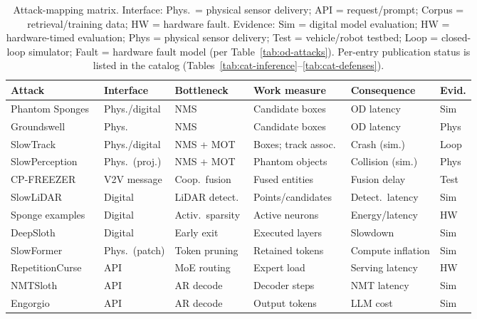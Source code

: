 \documentclass[acmsmall,screen,review,nonacm]{acmart}
\begin{document}
\begin{table}[htbp]
  \caption{Attack-mapping matrix. Interface: Phys.\ = physical sensor delivery; API = request/prompt; Corpus = retrieval/training data; HW = hardware fault. Evidence: Sim = digital model evaluation; HW = hardware-timed evaluation; Phys = physical sensor delivery; Test = vehicle/robot testbed; Loop = closed-loop simulator; Fault = hardware fault model (per Table~\ref{tab:od-attacks}). Per-entry publication status is listed in the catalog (Tables~\ref{tab:cat-inference}--\ref{tab:cat-defenses}).}
  \label{tab:matrix}
  \footnotesize
  \setlength{\tabcolsep}{5pt}
  \begin{tabularx}{\textwidth}{@{}l l L{2.4cm} L{2.6cm} L{2.6cm} l@{}}
    \toprule
    \textbf{Attack} & \textbf{Interface} & \textbf{Bottleneck} & \textbf{Work measure} & \textbf{Consequence} & \textbf{Evid.} \\
    \midrule
    Phantom Sponges~\cite{shapira2023phantom} & Phys./digital & NMS & Candidate boxes & OD latency & Sim \\
    Groundswell~\cite{xia2026groundswell} & Phys.\ & NMS & Candidate boxes & OD latency & Phys \\
    SlowTrack~\cite{ma2024slowtrack} & Phys./digital & NMS + MOT & Boxes; track assoc.\ & Crash (sim.) & Loop \\
    SlowPerception~\cite{ma2024slowperception} & Phys.\ (proj.) & NMS + MOT & Phantom objects & Collision (sim.) & Phys \\
    CP-FREEZER~\cite{wang2026cpfreezer} & V2V message & Coop.\ fusion & Fused entities & Fusion delay & Test \\
    SlowLiDAR~\cite{liu2023slowlidar} & Digital & LiDAR detect.\ & Points/candidates & Detect.\ latency & Sim \\
    Sponge examples~\cite{shumailov2021sponge} & Digital & Activ.\ sparsity & Active neurons & Energy/latency & HW \\
    DeepSloth~\cite{hong2021deepsloth} & Digital & Early exit & Executed layers & Slowdown & Sim \\
    SlowFormer~\cite{navaneet2024slowformer} & Phys.\ (patch) & Token pruning & Retained tokens & Compute inflation & Sim \\
    RepetitionCurse~\cite{huang2025repetitioncurse} & API & MoE routing & Expert load & Serving latency & HW \\
    NMTSloth~\cite{chen2022nmtsloth} & API & AR decode & Decoder steps & NMT latency & Sim \\
    Engorgio~\cite{dong2024engorgio} & API & AR decode & Output tokens & LLM cost & Sim \\

\end{tabularx}
\end{table}
\end{document}
